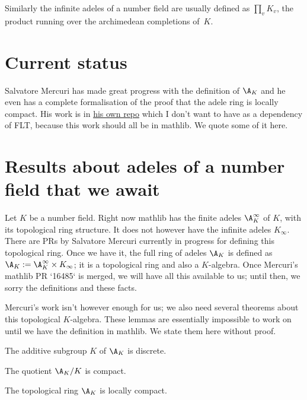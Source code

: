 Similarly the infinite adeles of a number field
are usually defined as $\prod_v K_v$,
the product running over the archimedean completions of~$K$.

\section{Current status}

Salvatore Mercuri has made great progress with the definition of $\A_K$ and he even
has a complete formalisation of the proof that the adele ring is locally compact. His work is in
\href{https://github.com/smmercuri/adele-ring_locally-compact}{his own repo} which
I don't want to have as a dependency of FLT, because this work should all be
in mathlib. We quote some of it here.

\section{Results about adeles of a number field that we await}

Let $K$ be a number field. Right now mathlib has the finite adeles $\A_K^\infty$ of $K$,
with its topological ring structure. It does not however have the infinite adeles $K_\infty$.
There are PRs by Salvatore Mercuri currently
in progress for defining this topological ring. Once we have it, the full ring of
adeles $\A_K$ is defined as $\A_K:=\A_K^\infty\times K_\infty$; it is a topological ring
and also a $K$-algebra. Once Mercuri's mathlib PR `16485` is merged, we will have
all this available to us; until then, we sorry the definitions and these facts.

Mercuri's work isn't however enough for us; we also need several theorems about this topological
$K$-algebra. These lemmas are essentially impossible to work on until we have the definition in
mathlib. We state them here without proof.

\begin{theorem}
  \label{NumberField.AdeleRing.discrete}
  The additive subgroup $K$ of $\A_K$ is discrete.
\end{theorem}

\begin{theorem}
  \label{NumberField.AdeleRing.cocompact}
  The quotient $\A_K/K$ is compact.
\end{theorem}

\begin{theorem}
  \label{NumberField.AdeleRing.locallyCompact}
  The topological ring $\A_K$ is locally compact.
\end{theorem}

